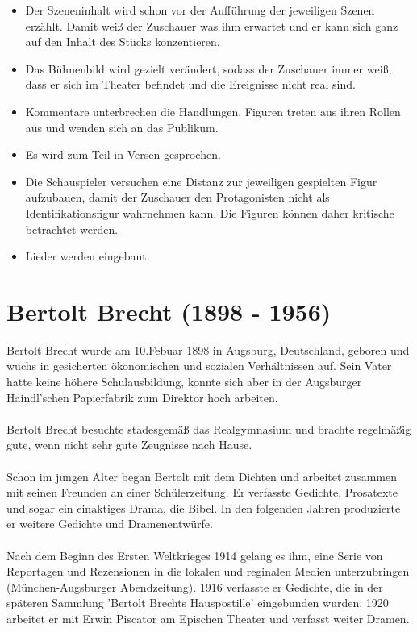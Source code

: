 \documentclass[a4paper]{article}
\begin{document}
        \begin{itemize}
	\item Der Szeneninhalt wird schon vor der Aufführung der jeweiligen Szenen erzählt. Damit weiß der Zuschauer was ihm erwartet und er kann sich ganz auf den Inhalt des Stücks konzentieren.
        \item Das Bühnenbild wird gezielt verändert, sodass der Zuschauer immer weiß, dass er sich im Theater befindet und die Ereignisse nicht real sind.
        \item Kommentare unterbrechen die Handlungen, Figuren treten aus ihren Rollen aus und wenden sich an das Publikum.
        \item Es wird zum Teil in Versen gesprochen.
        \item Die Schauspieler versuchen eine Distanz zur jeweiligen gespielten Figur aufzubauen, damit der Zuschauer den Protagonisten nicht als Identifikationsfigur wahrnehmen kann. Die Figuren können daher kritische betrachtet werden.
        \item Lieder werden eingebaut.
        \end{itemize}
        
        \newpage
        \section{Bertolt Brecht (1898 - 1956)}

	Bertolt Brecht wurde am 10.Febuar 1898 in Augsburg, Deutschland, geboren und wuchs in gesicherten ökonomischen und sozialen Verhältnissen auf. Sein Vater hatte keine höhere Schulausbildung, konnte sich aber in der Augsburger Haindl'schen Papierfabrik zum Direktor hoch arbeiten.\\\\
        Bertolt Brecht besuchte stadesgemäß das Realgymnasium und brachte regelmäßig gute, wenn nicht sehr gute Zeugnisse nach Hause.\\\\
        Schon im jungen Alter began Bertolt mit dem Dichten und arbeitet zusammen mit seinen Freunden an einer Schülerzeitung. Er verfasste Gedichte, Prosatexte und sogar ein einaktiges Drama, die Bibel. In den folgenden Jahren produzierte er weitere Gedichte und Dramenentwürfe.\\\\
        Nach dem Beginn des Ersten Weltkrieges 1914 gelang es ihm, eine Serie von Reportagen und Rezensionen in die lokalen und reginalen Medien unterzubringen (München-Augsburger Abendzeitung). 1916 verfasste er Gedichte, die in der späteren Sammlung 'Bertolt Brechts Hauspostille' eingebunden wurden. 1920 arbeitet er mit Erwin Piscator am Epischen Theater und verfasst weiter Dramen.\\\\
\end{document}
